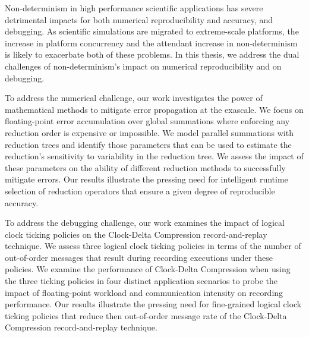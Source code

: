 Non-determinism in high performance scientific applications
has severe detrimental impacts for both numerical
reproducibility and accuracy, and debugging. 
As scientific simulations are migrated to extreme-scale 
platforms, the increase in platform concurrency and the
attendant increase in non-determinism is likely to 
exacerbate both of these problems. 
In this thesis, we address the dual challenges of 
non-determinism's impact on numerical reproducibility 
and on debugging. 

To address the numerical challenge, 
our work investigates the power of mathematical
methods to mitigate error propagation at the exascale. We focus on
floating-point error accumulation over global summations where
enforcing any reduction order is expensive or impossible. We model
parallel summations with reduction trees and identify those parameters
that can be used to estimate the reduction's sensitivity to
variability in the reduction tree.  We assess the impact of these
parameters on the ability of different reduction methods to
successfully mitigate errors. Our results illustrate the pressing need
for intelligent runtime selection of reduction operators that ensure a
given degree of reproducible accuracy.

To address the debugging challenge,
our work examines the impact of logical clock ticking
policies on the Clock-Delta Compression record-and-replay
technique. We assess three logical clock ticking policies
in terms of the number of out-of-order messages that result
during recording executions under these policies.
We examine the performance of Clock-Delta Compression when 
using the three ticking policies in four distinct application
scenarios to probe the impact of floating-point workload and 
communication intensity on recording performance. 
Our results illustrate the pressing need for fine-grained logical clock ticking policies that reduce then out-of-order message rate of the Clock-Delta Compression record-and-replay technique.

